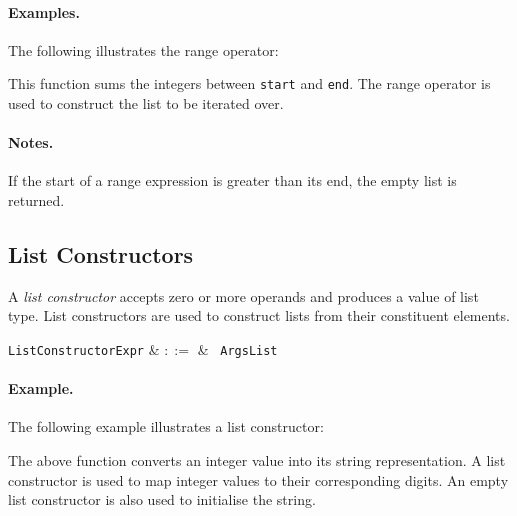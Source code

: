 \paragraph{Examples.}  The following illustrates the range operator:



This function sums the integers between \lstinline{start} and \lstinline{end}.  The range operator is used to construct the list to be iterated over.

\paragraph{Notes.}  If the start of a range expression is greater than its end, the empty list is returned.


\subsection{List Constructors}
\label{c_expr_list_constructor}
A {\em list constructor} accepts zero or more operands and produces a value of list type.  List constructors are used to construct lists from their constituent elements.  

\begin{syntax}
  \verb+ListConstructorExpr+ & $::=$ & \token{[}\ \verb+ArgsList+ \token{]}\\
\end{syntax}

\paragraph{Example.}  The following example illustrates a list constructor:



The above function converts an integer value into its string representation.  A list constructor is used to map integer values to their corresponding digits.  An empty list constructor is also used to initialise the string.


